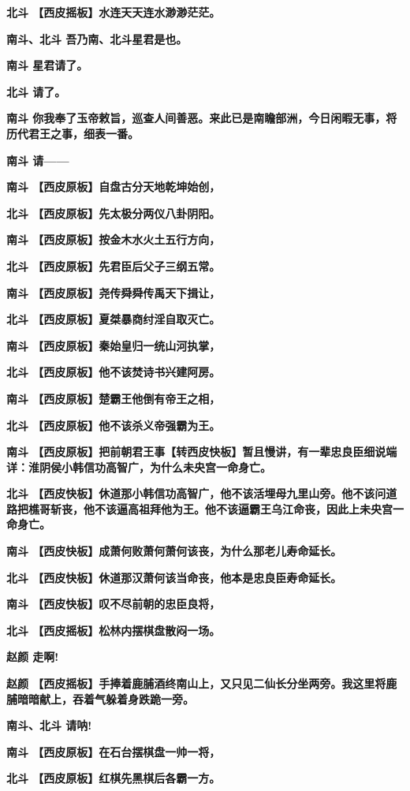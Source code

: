 \textbf{北斗 【西皮摇板】水连天天连水渺渺茫茫。}

\textbf{南斗、北斗 吾乃南、北斗星君是也。}

\textbf{南斗 星君请了。}

\textbf{北斗 请了。}

\textbf{南斗
你我奉了玉帝敕旨，巡查人间善恶。来此已是南瞻部洲，今日闲暇无事，将历代君王之事，细表一番。}

\textbf{南斗 请------}

\textbf{南斗 【西皮原板】自盘古分天地乾坤始创，}

\textbf{北斗 【西皮原板】先太极分两仪八卦阴阳。}

\textbf{南斗 【西皮原板】按金木水火土五行方向，}

\textbf{北斗 【西皮原板】先君臣后父子三纲五常。}

\textbf{南斗 【西皮原板】尧传舜舜传禹天下揖让，}

\textbf{北斗 【西皮原板】夏桀暴商纣淫自取灭亡。}

\textbf{南斗 【西皮原板】秦始皇归一统山河执掌，}

\textbf{北斗 【西皮原板】他不该焚诗书兴建阿房。}

\textbf{南斗 【西皮原板】楚霸王他倒有帝王之相，}

\textbf{北斗 【西皮原板】他不该杀义帝强霸为王。}

\textbf{南斗
【西皮原板】把前朝君王事【转西皮快板】暂且慢讲，有一辈忠良臣细说端详：淮阴侯小韩信功高智广，为什么未央宫一命身亡。}

\textbf{北斗
【西皮快板】休道那小韩信功高智广，他不该活埋母九里山旁。他不该问道路把樵哥斩丧，他不该逼高祖拜他为王。他不该逼霸王乌江命丧，因此上未央宫一命身亡。}

\textbf{南斗 【西皮快板】成萧何败萧何萧何该丧，为什么那老儿寿命延长。}

\textbf{北斗 【西皮快板】休道那汉萧何该当命丧，他本是忠良臣寿命延长。}

\textbf{南斗 【西皮快板】叹不尽前朝的忠臣良将，}

\textbf{北斗 【西皮摇板】松林内摆棋盘散闷一场。}

\textbf{赵颜 走啊!}

\textbf{赵颜
【西皮摇板】手捧着鹿脯酒终南山上，又只见二仙长分坐两旁。我这里将鹿脯暗暗献上，吞着气躲着身跌跪一旁。}

\textbf{南斗、北斗 请呐!}

\textbf{南斗 【西皮原板】在石台摆棋盘一帅一将，}

\textbf{北斗 【西皮原板】红棋先黑棋后各霸一方。}

